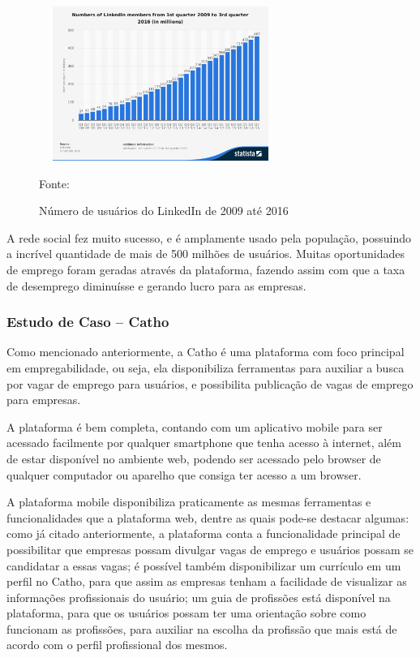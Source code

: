 \begin{figure}[!h]
	\centering
	\caption{Número de usuários do LinkedIn de 2009 até 2016 }
	\includegraphics[width=300px, height=190px]{./images/linkedinMobile2.png}
	\par {Fonte: \cite{linkedin-c}}
\end{figure}

A rede social fez muito sucesso, e é amplamente usado pela população, possuindo a incrível quantidade de mais de 500 milhões de usuários. Muitas oportunidades de emprego foram geradas através da plataforma, fazendo assim com que a taxa de desemprego diminuísse e gerando lucro para as empresas.


\subsubsection{Estudo de Caso – Catho}

Como mencionado anteriormente, a Catho é uma plataforma com foco principal em empregabilidade, ou seja, ela disponibiliza ferramentas para auxiliar a busca por vagar de emprego para usuários, e possibilita publicação de vagas de emprego para empresas.

A plataforma é bem completa, contando com um aplicativo mobile para ser acessado facilmente por qualquer smartphone que tenha acesso à internet, além de estar disponível no ambiente web, podendo ser acessado pelo browser de qualquer computador ou aparelho que consiga ter acesso a um browser.

A plataforma mobile disponibiliza praticamente as mesmas ferramentas e funcionalidades que a plataforma web, dentre as quais pode-se destacar algumas: como já citado anteriormente, a plataforma conta a funcionalidade principal de possibilitar que empresas possam divulgar vagas de emprego e usuários possam se candidatar a essas vagas; é possível também disponibilizar um currículo em um perfil no Catho, para que assim as empresas tenham a facilidade de visualizar as informações profissionais do usuário; um guia de profissões está disponível na plataforma, para que os usuários possam ter uma orientação sobre como funcionam as profissões, para auxiliar na escolha da profissão que mais está de acordo com o perfil profissional dos mesmos.

